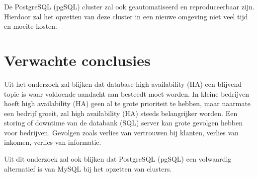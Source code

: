 De PostgreSQL (pgSQL) cluster zal ook geautomatiseerd en reproduceerbaar zijn. Hierdoor zal het opzetten van deze cluster in een nieuwe omgeving niet veel tijd en moeite kosten.


\section{Verwachte conclusies}
\label{sec:verwachte_conclusies}
Uit het onderzoek zal blijken dat database high availability (HA) een blijvend topic is waar voldoende aandacht aan besteedt moet worden. In kleine bedrijven hoeft high availability (HA) geen al te grote prioriteit te hebben, maar naarmate een bedrijf groeit, zal high availability (HA) steeds belangrijker worden. Een storing of downtime van de databank (SQL) server kan grote gevolgen hebben voor bedrijven. Gevolgen zoals verlies van vertrouwen bij klanten, verlies van inkomen, verlies van informatie.

Uit dit onderzoek zal ook blijken dat PostgreSQL (pgSQL) een volwaardig alternatief is van MySQL bij het opzetten van clusters.

